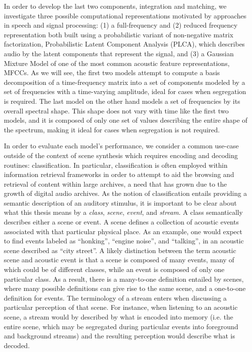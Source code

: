 \documentclass[a4paper,10pt,final]{ThesisStyle}
\begin{document}
In order to develop the last two components, integration and matching, we investigate three possible computational representations motivated by approaches in speech and signal processing: (1) a full-frequency and (2) reduced frequency representation both built using a probabilistic variant of non-negative matrix factorization, Probabilistic Latent Component Analysis (PLCA), which describes audio by the latent components that represent the signal, and (3) a Gaussian Mixture Model of one of the most common acoustic feature representations, MFCCs.  As we will see, the first two models attempt to compute a basis decomposition of a time-frequency matrix into a set of components modeled by a set of frequencies with a time-varying amplitude, ideal for cases when segregation is required.  The last model on the other hand models a set of frequencies by its overall spectral shape.  This shape does not vary with time like the first two models, and it is composed of only one set of values describing the entire shape of the spectrum, making it ideal for cases when segregation is not required.

In order to evaluate each model's performance, we consider a common use-case outside of the context of scene synthesis which requires encoding and decoding routines: classification.  In particular, classification is often employed within information retrieval frameworks in order to attempt to aid the browsing and retrieval of content within large archives, a need that has grown due to the growth of digital audio archives.  As the notion of classification entails providing a semantic description of an auditory stimulus, it is important to be clear about what this thesis means by a \textit{class}, \textit{scene}, \textit{event}, and \textit{stream}.  A class semantically describes either a scene or event.  A scene defines a collection of acoustic events associated with that particular physical place.  As an example, one would expect to find events labeled as ``honking'', ``engine noise'', and ``talking'', in an acoustic scene described as ``city street''.  A likely distinction between the term acoustic scene and acoustic event is that a scene is composed of many events, many of which could be of different classes, while an event is composed of only one particular class.  As a result, there is a many-to-one definition entailed by scenes, where many possible definitions can give rise to the same scene, and a one-to-one definition for events.  The terminology of a stream enters when discussing a particular perception of that scene.  For instance, when listening to an acoustic scene, a stream would by described by what is encoded into memory (i.e. the entire scene, which may be segregated during particular events into foreground and background streams) and the resulting perception would describe what is decoded.  
\end{document}
